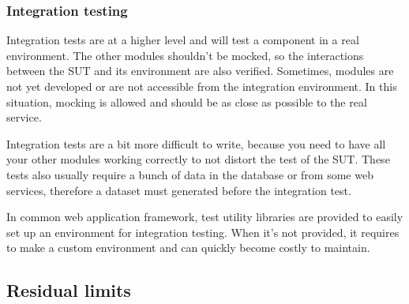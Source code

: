 \subsubsection{Integration testing}
Integration tests are at a higher level and will test a component in a real
environment.
The other modules shouldn't be mocked, so the interactions between the SUT
and its environment are also verified.
Sometimes, modules are not yet developed or are not accessible from the
integration environment.
In this situation, mocking is allowed and should be as close as possible to the
real service.

Integration tests are a bit more difficult to write, because you need to have
all your other modules working correctly to not distort the test of the SUT\@.
These tests also usually require a bunch of data in the database or from some
web services, therefore a dataset must generated before the integration test.

In common web application framework, test utility libraries are provided to
easily set up an environment for integration testing.
When it's not provided, it requires to make a custom environment and can
quickly become costly to maintain.

\subsection{Residual limits}\label{subsec:residual-limits}
